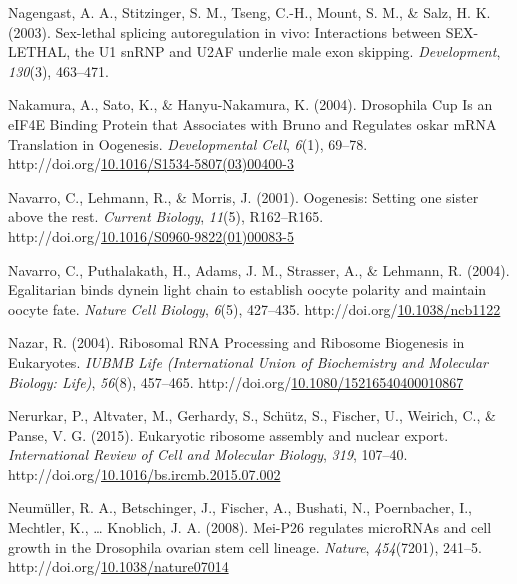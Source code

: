 \documentclass[12pt,oneside]{reedthesis}
\newlength{\cslhangindent}
\newenvironment{CSLReferences}[2] %
 {%
  \setlength{\parindent}{0pt}
  \ifodd #1 \everypar{\setlength{\hangindent}{\cslhangindent}}\ignorespaces\fi
  \ifnum #2 > 0
  \setlength{\parskip}{#2\baselineskip}
  \fi
 }%
 {}
\begin{document}
\begin{CSLReferences}{1}{0}
\leavevmode{}%
Nagengast, A. A., Stitzinger, S. M., Tseng, C.-H., Mount, S. M., \& Salz, H. K. (2003). Sex-lethal splicing autoregulation in vivo: Interactions between {SEX-LETHAL}, the {U1 snRNP} and {U2AF} underlie male exon skipping. \emph{Development}, \emph{130}(3), 463--471.

\leavevmode{}%
Nakamura, A., Sato, K., \& Hanyu-Nakamura, K. (2004). Drosophila {Cup Is} an {eIF4E Binding Protein} that {Associates} with {Bruno} and {Regulates} oskar {mRNA Translation} in {Oogenesis}. \emph{Developmental Cell}, \emph{6}(1), 69--78. http://doi.org/\href{https://doi.org/10.1016/S1534-5807(03)00400-3}{10.1016/S1534-5807(03)00400-3}

\leavevmode{}%
Navarro, C., Lehmann, R., \& Morris, J. (2001). Oogenesis: {Setting} one sister above the rest. \emph{Current Biology}, \emph{11}(5), R162--R165. http://doi.org/\href{https://doi.org/10.1016/S0960-9822(01)00083-5}{10.1016/S0960-9822(01)00083-5}

\leavevmode{}%
Navarro, C., Puthalakath, H., Adams, J. M., Strasser, A., \& Lehmann, R. (2004). Egalitarian binds dynein light chain to establish oocyte polarity and maintain oocyte fate. \emph{Nature Cell Biology}, \emph{6}(5), 427--435. http://doi.org/\href{https://doi.org/10.1038/ncb1122}{10.1038/ncb1122}

\leavevmode{}%
Nazar, R. (2004). Ribosomal {RNA Processing} and {Ribosome Biogenesis} in {Eukaryotes}. \emph{IUBMB Life (International Union of Biochemistry and Molecular Biology: Life)}, \emph{56}(8), 457--465. http://doi.org/\href{https://doi.org/10.1080/15216540400010867}{10.1080/15216540400010867}

\leavevmode{}%
Nerurkar, P., Altvater, M., Gerhardy, S., Schütz, S., Fischer, U., Weirich, C., \& Panse, V. G. (2015). Eukaryotic ribosome assembly and nuclear export. \emph{International Review of Cell and Molecular Biology}, \emph{319}, 107--40. http://doi.org/\href{https://doi.org/10.1016/bs.ircmb.2015.07.002}{10.1016/bs.ircmb.2015.07.002}

\leavevmode{}%
Neumüller, R. A., Betschinger, J., Fischer, A., Bushati, N., Poernbacher, I., Mechtler, K., \ldots{} Knoblich, J. A. (2008). Mei-{P26} regulates {microRNAs} and cell growth in the {Drosophila} ovarian stem cell lineage. \emph{Nature}, \emph{454}(7201), 241--5. http://doi.org/\href{https://doi.org/10.1038/nature07014}{10.1038/nature07014}


\end{CSLReferences}
\end{document}
